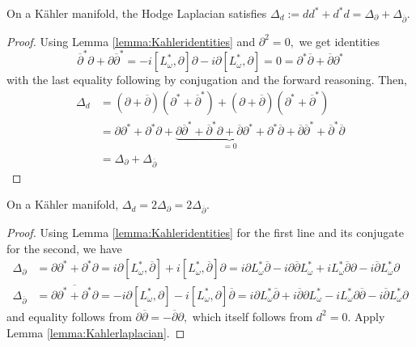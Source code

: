 \begin{lemma}\label{lemma:Kahlerlaplacian}
    On a K\"ahler manifold, the Hodge Laplacian satisfies $\Delta_d :=dd^* + d^*d  = \Delta_\partial + \Delta_{\overline \partial}.$
\end{lemma}
\begin{proof}
    Using Lemma \ref{lemma:Kahleridentities} and $\partial^2 = 0,$ we get identities
    \[
    \overline \partial^* \partial + \partial \overline \partial^* = -i[L^*_\omega , \partial]\partial - i\partial [L^*_\omega, \partial] = 0 = \partial^* \overline\partial + \overline\partial  \partial^*  
    \]
    with the last equality following by conjugation and the forward reasoning. Then,
    \begin{align*}
    \Delta_d &= (\partial + \overline \partial)(\partial ^*+ \overline \partial^*) + (\partial + \overline \partial)(\partial ^*+ \overline \partial^*)\\
    &= \partial \partial^* + \partial^*\partial +
    \underbrace{\partial \overline \partial^* + \overline \partial^*\partial + 
    \overline \partial\partial^* + \partial^*\overline \partial}_{=0} + 
    \overline\partial\overline\partial^* + \overline \partial^*\overline\partial\\
    &= \Delta_\partial + \Delta_{\overline \partial}
    \end{align*}
\end{proof}


\begin{lemma} \label{lem:Kahlerlaplacian2}
    On a K\"ahler manifold, $\Delta_d = 2\Delta_{\partial} =2 \Delta_{\overline \partial}.$
\end{lemma}
\begin{proof}
    Using Lemma \ref{lemma:Kahleridentities} for the first line and its conjugate for the second, we have
    \begin{align*}
    \Delta_\partial  &= \partial \partial^* + \partial ^*\partial  = i\partial[L^*_\omega, \overline\partial] + i[L^*_\omega, \overline\partial]\partial = i\partial L^*_\omega \overline\partial -i\partial \overline\partial L^*_\omega +i L^*_\omega\overline\partial\partial -i\overline\partial L^*_\omega\partial \\
    \Delta_{\overline \partial}& = \overline{\partial \partial^* + \partial ^*\partial} = -i\partial[L^*_\omega, \partial] - i[L^*_\omega, \partial]\overline\partial = i\partial L^*_\omega \overline\partial + i\overline\partial\partial L^*_\omega-iL^*_\omega \partial\overline\partial  -i\overline\partial L^*_\omega\partial
    \end{align*}
    and equality follows from $\partial \overline\partial = - \overline\partial\partial,$ which itself follows from $d^2=0.$ Apply Lemma \ref{lemma:Kahlerlaplacian}.
\end{proof}

